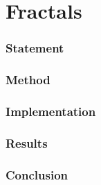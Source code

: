 \part{Fractals}

\section{Statement}
\section{Method}
\section{Implementation}
\section{Results}
\section{Conclusion}
